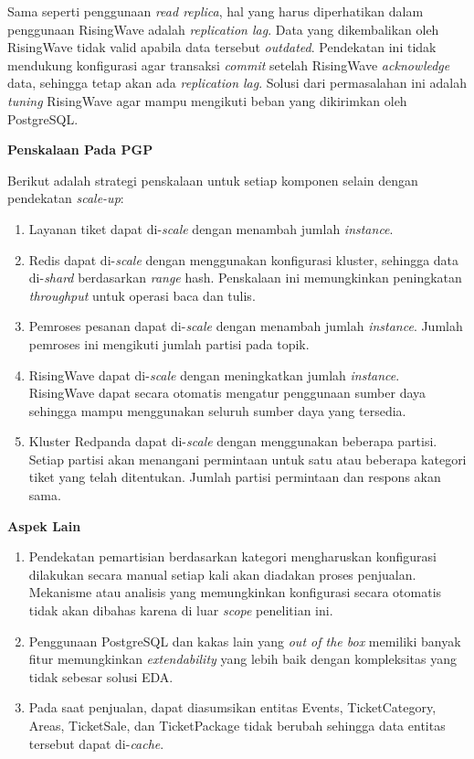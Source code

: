 Sama seperti penggunaan \textit{read replica}, hal yang harus diperhatikan dalam penggunaan RisingWave adalah \textit{replication lag}. Data yang dikembalikan oleh RisingWave tidak valid apabila data tersebut \textit{outdated}. Pendekatan ini tidak mendukung konfigurasi agar transaksi \textit{commit} setelah RisingWave \textit{acknowledge} data, sehingga tetap akan ada \textit{replication lag}. Solusi dari permasalahan ini adalah \textit{tuning} RisingWave agar mampu mengikuti beban yang dikirimkan oleh PostgreSQL.

\textbf{Penskalaan Pada PGP}

Berikut adalah strategi penskalaan untuk setiap komponen selain dengan pendekatan \textit{scale-up}:

\begin{enumerate}
    \item Layanan tiket dapat di-\textit{scale} dengan menambah jumlah \textit{instance}.
    \item Redis dapat di-\textit{scale} dengan menggunakan konfigurasi kluster, sehingga data di-\textit{shard} berdasarkan \textit{range} hash. Penskalaan ini memungkinkan peningkatan \textit{throughput} untuk operasi baca dan tulis.
    \item Pemroses pesanan dapat di-\textit{scale} dengan menambah jumlah \textit{instance}. Jumlah pemroses ini mengikuti jumlah partisi pada topik.
    \item RisingWave dapat di-\textit{scale} dengan meningkatkan jumlah \textit{instance}. RisingWave dapat secara otomatis mengatur penggunaan sumber daya sehingga mampu menggunakan seluruh sumber daya yang tersedia.
    \item Kluster Redpanda dapat di-\textit{scale} dengan menggunakan beberapa partisi. Setiap partisi akan menangani permintaan untuk satu atau beberapa kategori tiket yang telah ditentukan. Jumlah partisi permintaan dan respons akan sama.
\end{enumerate}

\textbf{Aspek Lain}

\begin{enumerate}
    \item Pendekatan pemartisian berdasarkan kategori mengharuskan konfigurasi dilakukan secara manual setiap kali akan diadakan proses penjualan. Mekanisme atau analisis yang memungkinkan konfigurasi secara otomatis tidak akan dibahas karena di luar \textit{scope} penelitian ini.
    \item Penggunaan PostgreSQL dan kakas lain yang \textit{out of the box} memiliki banyak fitur memungkinkan \textit{extendability} yang lebih baik dengan kompleksitas yang tidak sebesar solusi EDA.
    \item Pada saat penjualan, dapat diasumsikan entitas Events, TicketCategory, Areas, TicketSale, dan TicketPackage tidak berubah sehingga data entitas tersebut dapat di-\textit{cache}.
\end{enumerate}